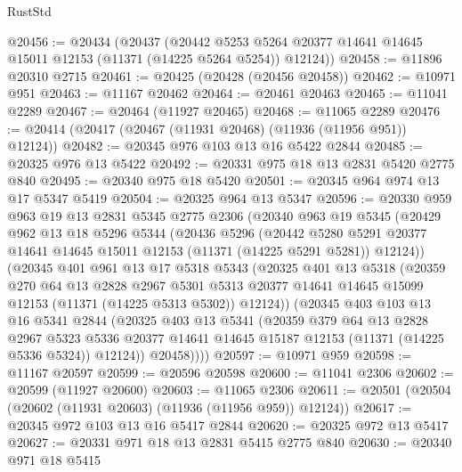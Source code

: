 \begin{lexlean}{RustStd}
\begin{coremodule}
{\begin{coremodule}
{{{{{{{{{{{{{{{{{{{{{{{{{{{{{{{{{@20456 := @20434
    (@20437
      (@20442 @5253 @5264 @20377 @14641 @14645 @15011 @12153 (@11371 (@14225 @5264 @5254)) @12124))
@20458 := @11896 @20310 @2715
@20461 := @20425 (@20428 (@20456 @20458))
@20462 := @10971 @951
@20463 := @11167 @20462
@20464 := @20461 @20463
@20465 := @11041 @2289
@20467 := @20464 (@11927 @20465)
@20468 := @11065 @2289
@20476 := @20414 (@20417 (@20467 (@11931 @20468) (@11936 (@11956 @951)) @12124))
@20482 := @20345 @976 @103 @13 @16 @5422 @2844
@20485 := @20325 @976 @13 @5422
@20492 := @20331 @975 @18 @13 @2831 @5420 @2775 @840
@20495 := @20340 @975 @18 @5420
@20501 := @20345 @964 @974 @13 @17 @5347 @5419
@20504 := @20325 @964 @13 @5347
@20596 := @20330
    @959
    @963
    @19
    @13
    @2831
    @5345
    @2775
    @2306
    (@20340
      @963
      @19
      @5345
      (@20429
        @962
        @13
        @18
        @5296
        @5344
        (@20436
          @5296
          (@20442
            @5280
            @5291
            @20377
            @14641
            @14645
            @15011
            @12153
            (@11371 (@14225 @5291 @5281))
            @12124))
        (@20345
          @401
          @961
          @13
          @17
          @5318
          @5343
          (@20325
            @401
            @13
            @5318
            (@20359
              @270
              @64
              @13
              @2828
              @2967
              @5301
              @5313
              @20377
              @14641
              @14645
              @15099
              @12153
              (@11371 (@14225 @5313 @5302))
              @12124))
          (@20345
            @403
            @103
            @13
            @16
            @5341
            @2844
            (@20325
              @403
              @13
              @5341
              (@20359
                @379
                @64
                @13
                @2828
                @2967
                @5323
                @5336
                @20377
                @14641
                @14645
                @15187
                @12153
                (@11371 (@14225 @5336 @5324))
                @12124))
            @20458))))
@20597 := @10971 @959
@20598 := @11167 @20597
@20599 := @20596 @20598
@20600 := @11041 @2306
@20602 := @20599 (@11927 @20600)
@20603 := @11065 @2306
@20611 := @20501 (@20504 (@20602 (@11931 @20603) (@11936 (@11956 @959)) @12124))
@20617 := @20345 @972 @103 @13 @16 @5417 @2844
@20620 := @20325 @972 @13 @5417
@20627 := @20331 @971 @18 @13 @2831 @5415 @2775 @840
@20630 := @20340 @971 @18 @5415
}}}}}}}}}}}}}}}}}}}}}}}}}}}}}}}}}
\end{coremodule}}
\end{coremodule}
\end{lexlean}
